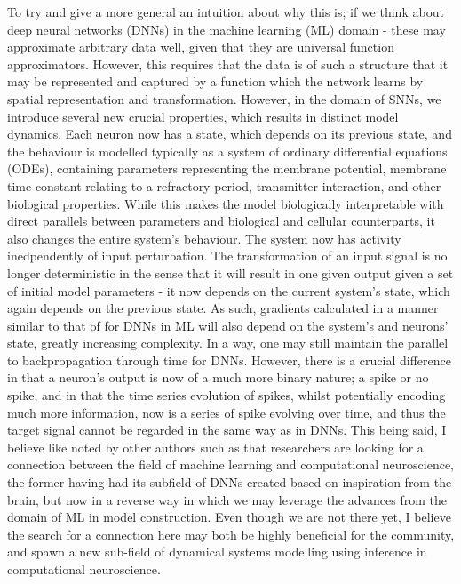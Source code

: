 \documentclass[mphil,deptreport,ianc]{infthesis} %
\begin{document}
To try and give a more general an intuition about why this is; if we think about deep neural networks (DNNs) in the machine learning (ML) domain - these may approximate arbitrary data well, given that they are universal function approximators. 
However, this requires that the data is of such a structure that it may be represented and captured by a function which the network learns by spatial representation and transformation.
However, in the domain of SNNs, we introduce several new crucial properties, which results in distinct model dynamics. Each neuron now has a state, which depends on its previous state, and the behaviour is modelled typically as a system of ordinary differential equations (ODEs), containing parameters representing the membrane potential, membrane time constant relating to a refractory period, transmitter interaction, and other biological properties. 
While this makes the model biologically interpretable with direct parallels between parameters and biological and cellular counterparts, it also changes the entire system's behaviour.
The system now has activity inedpendently of input perturbation. 
The transformation of an input signal is no longer deterministic in the sense that it will result in one given output given a set of initial model parameters - it now depends on the current system's state, which again depends on the previous state.
As such, gradients calculated in a manner similar to that of for DNNs in ML will also depend on the system's and neurons' state, greatly increasing complexity.
In a way, one may still maintain the parallel to backpropagation through time for DNNs. 
However, there is a crucial difference in that a neuron's output is now of a much more binary nature; a spike or no spike, and in that the time series evolution of spikes, whilst potentially encoding much more information, now is a series of spike evolving over time, and thus the target signal cannot be regarded in the same way as in DNNs.
This being said, I believe like noted by other authors such as \cite{Sindaci2018} that researchers are looking for a connection between the field of machine learning and computational neuroscience, the former having had its subfield of DNNs created based on inspiration from the brain, but now in a reverse way in which we may leverage the advances from the domain of ML in model construction.
Even though we are not there yet, I believe the search for a connection here may both be highly beneficial for the community, and spawn a new sub-field of dynamical systems modelling using inference in computational neuroscience.
\end{document}
